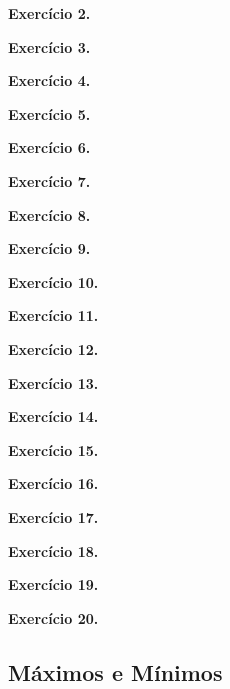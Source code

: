 \documentclass[12pt,a4paper]{article}
\begin{document}
\vspace{0.5cm}
\noindent\textbf{Exercício 2.}

\vspace{0.5cm}
\noindent\textbf{Exercício 3.}

\vspace{0.5cm}
\noindent\textbf{Exercício 4.}

\vspace{0.5cm}
\noindent\textbf{Exercício 5.}

\vspace{0.5cm}
\noindent\textbf{Exercício 6.}

\vspace{0.5cm}
\noindent\textbf{Exercício 7.}

\vspace{0.5cm}
\noindent\textbf{Exercício 8.}

\vspace{0.5cm}
\noindent\textbf{Exercício 9.}

\vspace{0.5cm}
\noindent\textbf{Exercício 10.}

\vspace{0.5cm}
\noindent\textbf{Exercício 11.}

\vspace{0.5cm}
\noindent\textbf{Exercício 12.}

\vspace{0.5cm}
\noindent\textbf{Exercício 13.}

\vspace{0.5cm}
\noindent\textbf{Exercício 14.}

\vspace{0.5cm}
\noindent\textbf{Exercício 15.}

\vspace{0.5cm}
\noindent\textbf{Exercício 16.}

\vspace{0.5cm}
\noindent\textbf{Exercício 17.}

\vspace{0.5cm}
\noindent\textbf{Exercício 18.}

\vspace{0.5cm}
\noindent\textbf{Exercício 19.}

\vspace{0.5cm}
\noindent\textbf{Exercício 20.}

\subsection{Máximos e Mínimos}
\end{document}
